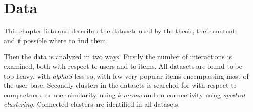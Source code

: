 
\chapter{Data}\label{cha:data}

This chapter lists and describes the datasets used by the thesis, their contents and if possible where to find them.

Then the data is analyzed in two ways. Firstly the number of interactions is examined, both with respect to users and to items. All datasets are found to be top heavy, with \textit{alphaS} less so, with few very popular items encompassing most of the user base. Secondly clusters in the datasets is searched for with respect to compactness, or user similarity, using \textit{k-means} and on connectivity using \textit{spectral clustering}. Connected clusters are identified in all datasets.





\newpage


